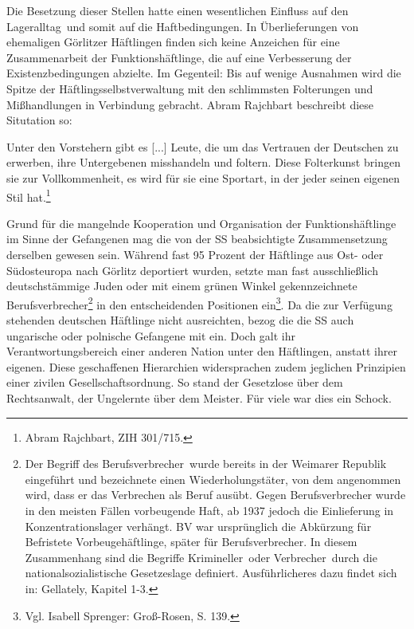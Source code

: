 Die Besetzung dieser Stellen hatte einen wesentlichen Einfluss auf den \glqq Lageralltag\grqq~und somit auf die Haftbedingungen. In Überlieferungen von ehemaligen Görlitzer Häftlingen finden sich keine Anzeichen für eine Zusammenarbeit der Funktionshäftlinge, die auf eine Verbesserung der Existenzbedingungen abzielte. Im Gegenteil: Bis auf wenige Ausnahmen wird die Spitze der Häftlingsselbstverwaltung mit den schlimmsten Folterungen und Mißhandlungen in Verbindung gebracht.
\newline Abram Rajchbart beschreibt diese Situtation so:
\begin{leftbar}
Unter den Vorstehern gibt es [...] Leute, die um das Vertrauen der Deutschen zu erwerben, ihre Untergebenen misshandeln und foltern.
Diese Folterkunst bringen sie zur Vollkommenheit, es wird für sie eine Sportart, in der jeder seinen eigenen Stil hat.\footnote{Abram Rajchbart, ZIH 301/715.}
\end{leftbar}
Grund für die mangelnde Kooperation und Organisation der Funktionshäftlinge im Sinne der Gefangenen mag die von der SS beabsichtigte Zusammensetzung derselben gewesen sein. Während fast 95 Prozent der Häftlinge aus Ost- oder Südosteuropa nach Görlitz deportiert wurden, setzte man fast ausschließlich deutschstämmige Juden oder mit einem grünen Winkel gekennzeichnete \glqq Berufsverbrecher\grqq\footnote{Der Begriff des \glqq Berufsverbrecher\grqq~wurde bereits in der Weimarer Republik eingeführt und bezeichnete einen Wiederholungstäter, von dem angenommen wird, dass er das Verbrechen als Beruf ausübt. Gegen Berufsverbrecher wurde in den meisten Fällen \glqq vorbeugende Haft\grqq, ab 1937 jedoch die Einlieferung in Konzentrationslager verhängt. BV war ursprünglich die Abkürzung für \glqq Befristete Vorbeugehäftlinge\grqq, später für Berufsverbrecher. In diesem Zusammenhang sind die Begriffe \glqq Krimineller\grqq~oder \glqq Verbrecher\grqq~durch die nationalsozialistische Gesetzeslage definiert. Ausführlicheres dazu findet sich in: Gellately, Kapitel 1-3.} in den entscheidenden Positionen ein\footnote{Vgl. Isabell Sprenger: Groß-Rosen, S. 139.}. Da die zur Verfügung stehenden deutschen Häftlinge nicht ausreichten, bezog die die SS auch ungarische oder polnische Gefangene mit ein. Doch galt ihr Verantwortungsbereich einer anderen Nation unter den Häftlingen, anstatt ihrer eigenen.
Diese geschaffenen Hierarchien widersprachen zudem jeglichen Prinzipien einer zivilen Gesellschaftsordnung. So stand der Gesetzlose über dem Rechtsanwalt, der Ungelernte über dem Meister. Für viele war dies ein Schock.

